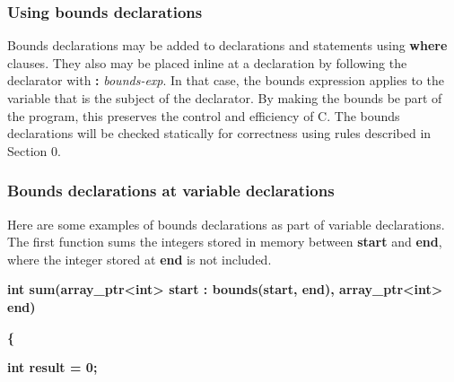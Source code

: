 \documentclass[]{article}
\begin{document}
\subsubsection{\texorpdfstring{\protect\hypertarget{ux5fRef418871981}{}{\protect\hypertarget{ux5fToc420589175}{}{\protect\hypertarget{ux5fToc422906966}{}{\protect\hypertarget{ux5fToc424307690}{}{\protect\hypertarget{ux5fToc426641067}{}{\protect\hypertarget{ux5fToc435434928}{}{\protect\hypertarget{ux5fToc437460749}{}{\protect\hypertarget{ux5fToc440445427}{}{\protect\hypertarget{ux5fToc440449209}{}{\protect\hypertarget{ux5fToc440551859}{}{}}}}}}}}}}Using
bounds
declarations}{Using bounds declarations}}\label{using-bounds-declarations}

Bounds declarations may be added to declarations and statements using
\textbf{where} clauses. They also may be placed inline at a declaration
by following the declarator with \textbf{:} \emph{bounds-exp}. In that
case, the bounds expression applies to the variable that is the subject
of the declarator. By making the bounds be part of the program, this
preserves the control and efficiency of C. The bounds declarations will
be checked statically for correctness using rules described in Section
0.

\subsubsection{\texorpdfstring{\protect\hypertarget{ux5fToc420589176}{}{\protect\hypertarget{ux5fToc422906967}{}{\protect\hypertarget{ux5fToc424307691}{}{\protect\hypertarget{ux5fToc426641068}{}{\protect\hypertarget{ux5fRef434915528}{}{\protect\hypertarget{ux5fToc435434929}{}{\protect\hypertarget{ux5fToc437460750}{}{\protect\hypertarget{ux5fToc440445428}{}{\protect\hypertarget{ux5fToc440449210}{}{\protect\hypertarget{ux5fToc440551860}{}{}}}}}}}}}}Bounds
declarations at variable
declarations}{Bounds declarations at variable declarations}}\label{bounds-declarations-at-variable-declarations}

Here are some examples of bounds declarations as part of variable
declarations. The first function sums the integers stored in memory
between \textbf{start} and \textbf{end}, where the integer stored at
\textbf{end} is not included.

\textbf{int sum(array\_ptr\textless{}int\textgreater{} start :
bounds(start, end), array\_ptr\textless{}int\textgreater{} end)}

\textbf{\{ }

\textbf{int result = 0;}
\end{document}
